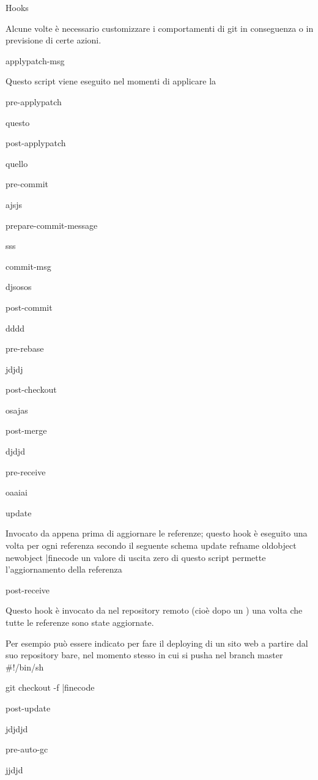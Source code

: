 \capitolo Hooks

Alcune volte \`e necessario customizzare i comportamenti di git in conseguenza o
in previsione di certe azioni.

\sezione applypatch-msg

Questo script viene eseguito nel momenti di applicare la

\sezione pre-applypatch

questo

\sezione post-applypatch

quello

\sezione pre-commit

ajsjs

\sezione prepare-commit-message

sss

\sezione commit-msg

djsosos

\sezione post-commit

dddd

\sezione pre-rebase

jdjdj

\sezione post-checkout

osajas

\sezione post-merge

djdjd

\sezione pre-receive

oaaiai

\sezione update

Invocato da  appena prima di aggiornare le referenze;
questo hook \`e eseguito una volta per ogni referenza secondo il seguente schema
\iniziacode
update refname oldobject newobject
|finecode
un valore di uscita zero di questo script permette l'aggiornamento della
referenza

\sezione post-receive

Questo hook \`e invocato da  nel repository remoto
(cio\`e dopo un ) una volta che tutte le referenze sono state
aggiornate.

Per esempio pu\`o essere indicato per fare il deploying di un sito web a partire
dal suo repository bare, nel momento stesso in cui si pusha nel branch master
\iniziacode
#!/bin/sh

git checkout -f
|finecode

\sezione post-update

jdjdjd

\sezione pre-auto-gc

jjdjd
